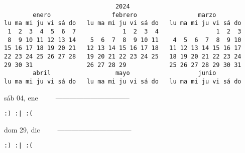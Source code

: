 \documentclass[letterpaper,10pt]{article}
\begin{document}
\begin{multicols}{3}
\begin{center}
\begin{tiny}
\begin{verbatim}                               2024
        enero                 febrero                 marzo
lu ma mi ju vi sá do   lu ma mi ju vi sá do   lu ma mi ju vi sá do
 1  2  3  4  5  6  7             1  2  3  4                1  2  3
 8  9 10 11 12 13 14    5  6  7  8  9 10 11    4  5  6  7  8  9 10
15 16 17 18 19 20 21   12 13 14 15 16 17 18   11 12 13 14 15 16 17
22 23 24 25 26 27 28   19 20 21 22 23 24 25   18 19 20 21 22 23 24
29 30 31               26 27 28 29            25 26 27 28 29 30 31
        abril                  mayo                   junio
lu ma mi ju vi sá do   lu ma mi ju vi sá do   lu ma mi ju vi sá do\end{verbatim}
\end{tiny}
\end{center}
{sáb 04, ene\ \ \ \ \ --------------------------------}
\begin{flushright}\begin{small}\texttt{:) :| :(}\end{small}\end{flushright}\par
{dom 29, dic\ \ \ \ \ --------------------------------}
\begin{flushright}\begin{small}\texttt{:) :| :(}\end{small}\end{flushright}\par
\end{multicols}
\end{document}
